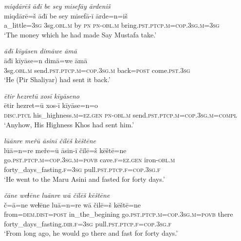 \ea \label{ŽP.113}
\textit{miqdārēš āđī be sey misefāy ārdeniš} \\ 
\gll miqdārē=š āđī be sey misefā-ī ārde=n=iš \\ 
 a\_little\textsc{=3sg} 3sg\textsc{.obl}\textsc{.m} by \textsc{pn} \textsc{pn}\textsc{-obl}\textsc{.m} bring\textsc{.pst}\textsc{.ptcp}\textsc{.m}\textsc{=cop}\textsc{.3sg}\textsc{.m}\textsc{=3sg} \\ 
\glt `The money which he had made Say Mustafa take.'
\z 
 
\ea \label{ŽP.115}
\textit{āđī kīyāsen dimāwe āmā} \\ 
\gll āđī kīyāse=n dimā=we āmā \\ 
 3sg\textsc{.obl}\textsc{.m} send\textsc{.pst}\textsc{.ptcp}\textsc{.m}\textsc{=cop}\textsc{.3sg}\textsc{.m} back\textsc{=\textsc{post}} come\textsc{.pst}\textsc{.3sg} \\ 
\glt `He (Pir Shaliyar) had sent it back.'
\z 
 
\ea \label{ŽP.117}
\textit{ētir hezretū xosī kīyāseno} \\ 
\gll ētir hezret=ū xos-ī kīyāse=n=o \\ 
 \textsc{disc.ptcl} his\_highness\textsc{.m}\textsc{\textsc{=ez.gen}} \textsc{pn}\textsc{-obl}\textsc{.m} send\textsc{.pst}\textsc{.ptcp}\textsc{.m}\textsc{=cop}\textsc{.3sg}\textsc{.m}\textsc{=compl} \\ 
\glt `Anyhow, His Highness Khos had sent him.'
\z 
 
\ea \label{ŽP.118}
\textit{lūānre meřū āsinī čilēš kēštēne} \\ 
\gll lūā=n=re meře=ū āsin-ī čilē=š kēštē=ne \\ 
 go\textsc{.pst}\textsc{.ptcp}\textsc{.m}\textsc{=cop}\textsc{.3sg}\textsc{.m}\textsc{=\textsc{povb}} cave\textsc{.f}\textsc{\textsc{=ez.gen}} iron\textsc{-obl}\textsc{.m} forty\_days\_fasting\textsc{.f}\textsc{=3sg} pull\textsc{.pst}\textsc{.ptcp}\textsc{.f}\textsc{=cop}\textsc{.3sg}\textsc{.f} \\ 
\glt `He went to the Maru Asini and fasted for forty days.'
\z 
 
\ea \label{ŽP.119}
\textit{čāne weɫēne luānre wā čilēš kēštēne} \\ 
\gll č=ā=ne weɫēne luā=n=re wā čilē=š kēštē=ne \\ 
 from=\textsc{dem.dist}\textsc{=\textsc{post}} in\_the\_begining go\textsc{.pst}\textsc{.ptcp}\textsc{.m}\textsc{=cop}\textsc{.3sg}\textsc{.m}\textsc{=\textsc{povb}} there forty\_days\_fasting\textsc{.dir}\textsc{.f}\textsc{=3sg} pull\textsc{.pst}\textsc{.ptcp}\textsc{.f}\textsc{=cop}\textsc{.3sg}\textsc{.f} \\ 
\glt `From long ago, he would go there and fast for forty days.'
\z 
 

